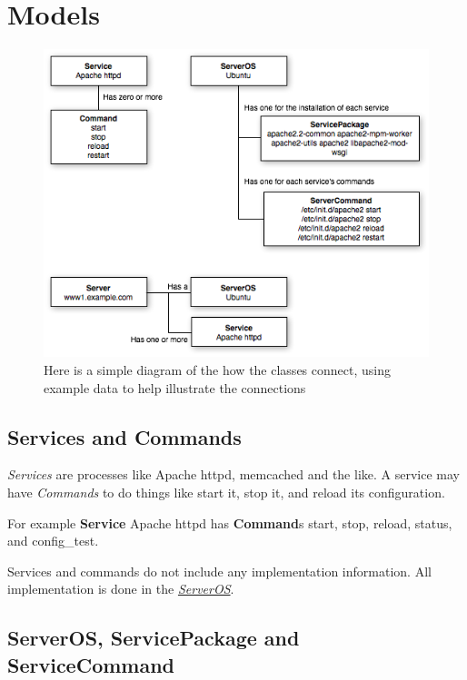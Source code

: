 \documentclass[letterpaper,10pt,english]{manual}
\begin{document}
\resetcurrentobjects
\hypertarget{--doc-models}{}

\hypertarget{models}{}\chapter{Models}
\begin{figure}[htbp]
\centering

\includegraphics{OMG_schema_example1.png}
\caption{Here is a simple diagram of the how the classes connect, using example data
to help illustrate the connections}\end{figure}


\hypertarget{models-service}{}\section{Services and Commands}

\emph{Services} are processes like Apache httpd, memcached and the like. A service may have \emph{Commands} to do things like start it, stop it, and reload its configuration.

For example \textbf{Service} Apache httpd has \textbf{Command}s start, stop, reload, status, and config\_test.

Services and commands do not include any implementation information. All implementation is done in the \hyperlink{models-serveros}{\emph{ServerOS}}.
\hypertarget{models-serveros}{}

\section{ServerOS, ServicePackage and ServiceCommand}
\end{document}
